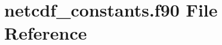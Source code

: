 \hypertarget{netcdf__constants_8f90}{}\section{netcdf\+\_\+constants.\+f90 File Reference}
\label{netcdf__constants_8f90}
